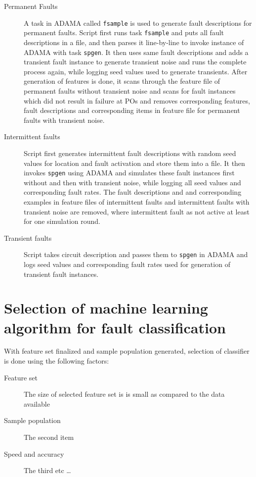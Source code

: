 \begin{description}
  \item[Permanent Faults] A task in ADAMA called \texttt{fsample} is used to generate fault descriptions for permanent faults. Script first runs task \texttt{fsample} and puts all fault descriptions in a file, and then parses it line-by-line to invoke instance of ADAMA with task \texttt{spgen}. It then uses same fault descriptions and adds a transient fault instance to generate transient noise and runs the complete process again, while logging seed values used to generate transients. After generation of features is done, it scans through the feature file of permanent faults without transient noise and scans for fault instances which did not result in failure at POs and removes corresponding features, fault descriptions and corresponding items in feature file for permanent faults with transient noise.

  \item[Intermittent faults] Script first generates intermittent fault descriptions with random seed values for location and fault activation and store them into a file. It then invokes \texttt{spgen} using ADAMA and simulates these fault instances first without and then with transient noise, while logging all seed values and corresponding fault rates. The fault descriptions and and corresponding examples in feature files of intermittent faults and intermittent faults with transient noise are removed, where intermittent fault as not active at least for one simulation round.

  \item[Transient faults] Script takes circuit description and passes them to \texttt{spgen} in ADAMA and logs seed values and corresponding fault rates used for generation of transient fault instances.
\end{description}

\section{Selection of machine learning algorithm for fault classification}
\label{sec:selml}

With feature set finalized and sample population generated, selection of classifier is done using the following factors:

\begin{description}
  \item[Feature set] The size of selected feature set is is small as compared to the data available
  \item[Sample population] The second item
  \item[Speed and accuracy] The third etc \ldots
\end{description}

